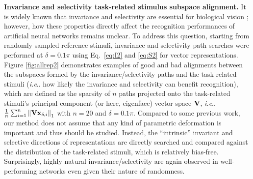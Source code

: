 \documentclass[fleqn]{article} %
\makeatletter
\DeclareRobustCommand\onedot{\futurelet\@let@token\@onedot}
\def\@onedot{\ifx\@let@token.\else.\null\fi\xspace}
\def\ie{\emph{i.e}\onedot} \def\Ie{\emph{I.e}\onedot}
\makeatother
\begin{document}
{\bf Invariance and selectivity \vs task-related stimulus subspace alignment.} 
It is widely known that invariance and selectivity are essential for biological vision \cite{desimone1991face, ito1995size}; however, how these properties directly affect the recognition performances of artificial neural networks remains unclear.
To address this question, starting from randomly sampled reference stimuli, invariance and selectivity path searches {were} performed at $\delta = 0.1\pi$ using Eq.~\ref{eq:I2} and \ref{eq:S2} for vector representations. 
Figure \ref{fig:allrep2} demonstrates examples of good and bad alignments between the subspaces formed by the invariance/selectivity paths and the task-related stimuli (\ie how likely the invariance and selectivity can benefit recognition), which are defined as the sparsity of $n$ paths projected onto the task-related stimuli's principal component (or here, eigenface) vector space $\bf{V}$, \ie $\frac{1}{n}\sum_{i=1}^{n} \left\| {\bf{Vx}}_{\delta,i} \right\|_{1}$ with $n=20$ and $\delta=0.1\pi$.
Compared to some previous work, our method does not assume that any kind of parametric deformation is important and thus should be studied.
Instead, the ``intrinsic'' invariant and selective directions of representations are directly searched and compared against the distribution of the task-related stimuli, which is relatively bias-free.
Surprisingly, highly natural invariance/selectivity are again observed in well-performing networks even given their nature of randomness.

\end{document}
